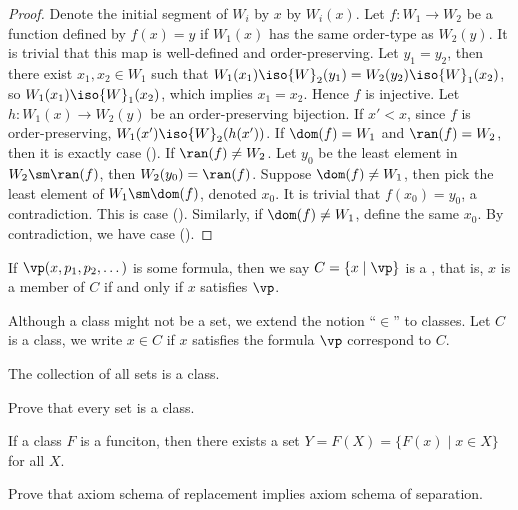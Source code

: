 \documentclass[10pt]{article}
\begin{document}
\begin{proof}
    Denote the initial segment of ${W}_{i}$ by $x$ by ${W}_{i}(x)$. Let $f:{W}_{1}\to{W}_{2}$ be a function defined by $f(x)=y$ if ${W}_{1}(x)$ has the same order-type as ${W}_{2}(y)$. It is trivial that this map is well-defined and order-preserving. Let ${y}_{1}={y}_{2}$, then there exist ${x}_{1},{x}_{2}\in{W}_{1}$ such that ${W}_{1}({x}_{1})\iso{W}_{2}({y}_{1})={W}_{2}({y}_{2})\iso{W}_{1}({x}_{2})$, so ${W}_{1}({x}_{1})\iso{W}_{1}({x}_{2})$, which implies ${x}_{1}={x}_{2}$. Hence $f$ is injective. Let $h:{W}_{1}(x)\to{W}_{2}(y)$ be an order-preserving bijection. If $x'<x$, since $f$ is order-preserving, ${W}_{1}(x')\iso{W}_{2}(h(x'))$. If $\dom(f)={W}_{1}$ and $\ran(f)={W}_{2}$, then it is exactly case (). If $\ran(f)\ne{W}_{2}$. Let ${y}_{0}$ be the least element in ${W}_{2}\sm\ran(f)$, then ${W}_{2}({y}_{0})=\ran(f)$. Suppose $\dom(f)\ne{W}_{1}$, then pick the least element of ${W}_{1}\sm\dom(f)$, denoted ${x}_{0}$. It is trivial that $f({x}_{0})={y}_{0}$, a contradiction. This is case (). Similarly, if $\dom(f)\ne{W}_{1}$, define the same ${x}_{0}$. By contradiction, we have case ().
\end{proof}
\begin{definition}
    If $\vp(x,{p}_{1},{p}_{2},\dots)$ is some formula, then we say $C=\{x\mid\vp\}$ is a , that is, $x$ is a member of $C$ if and only if $x$ satisfies $\vp$.
\end{definition}
\begin{remark}
    Although a class might not be a set, we extend the notion ``$\in$'' to classes. Let $C$ is a class, we write $x\in C$ if $x$ satisfies the formula $\vp$ correspond to $C$.
\end{remark}
\begin{example}
    The collection of all sets is a class.
\end{example}
\begin{problem}
    Prove that every set is a class.
\end{problem}
\begin{Axiom schema of replacement}
    If a class $F$ is a funciton, then there exists a set $Y=F(X)=\{F(x)\mid x\in X\}$ for all $X$.
\end{Axiom schema of replacement}
\begin{problem}
    Prove that axiom schema of replacement implies axiom schema of separation.
\end{problem}
\end{document}
